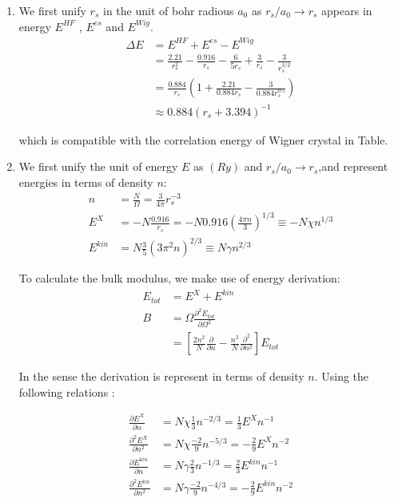 \documentclass[notitlepage]{revtex4-1}
\begin{document}
\begin{CJK}{UTF8}{bsmi}
\begin{enumerate}
 \item We first unify $r_s$ in the unit of bohr radious $a_0$ as $r_s/a_0 \rightarrow r_s$ appears in energy $E^{HF}$ , $E^{es}$ and $E^{Wig}$.
 \begin{align*}
 	\Delta E &= E^{HF} + E^{es} - E^{Wig} \\	
 			 &= \frac{2.21}{r_s^2} - \frac{0.916}{r_s} - \frac{6}{5r_s} + \frac{3}{r_s} - \frac{3}{r_s^{3/2}} \\
 			 &= \frac{0.884}{r_s}\left( 1 + \frac{2.21}{0.884r_s} - \frac{3}{0.884r_s^{0.5}}\right) \\
 			 &\approx 0.884(r_s+3.394)^{-1}
 \end{align*}
 
 which is compatible with the correlation energy of Wigner crystal in Table.
 	
 \item We first unify the unit of energy $E$ as $(Ry)$ and $r_s/a_0 \rightarrow r_s$,and represent energies in terms of density $n$:
 \begin{align*}
 		n    &= \frac{N}{\Omega} = \frac{3}{4\pi} r_s^{-3} \\
	 E^{X}   &= -N \frac{0.916}{r_s} = -N 0.916 \left( \frac{4\pi n}{3} \right)^{1/3} \equiv -N\chi n^{1/3}\\
	 E^{kin} &= N\frac{3}{5} (3\pi^2 n)^{2/3} \equiv N \gamma n^{2/3}
 \end{align*}
 
 To calculate the bulk modulus, we make use of energy derivation:
 \begin{align*}
 	E_{tot} &= E^{X} + E^{kin} \\
 	B &= \Omega \frac{\partial^2 E_{tot}}{\partial\Omega^2} \\
 	  &= \left[ \frac{2n^2}{N} \frac{\partial}{\partial n} - \frac{n^3}{N}\frac{\partial^2}{\partial n^2} \right]E_{tot}
 \end{align*}
 
 In the sense the derivation is represent in terms of density $n$. Using the following relations :
 
 \begin{align*}
 	\frac{\partial E^X}{\partial n } &= N \chi \frac{1}{3} n^{-2/3} = \frac{1}{3} E^X n^{-1}\\
 	\frac{\partial^2 E^X}{\partial n^2} &= N \chi \frac{-2}{9} n^{-5/3} = -\frac{2}{9} E^X n^{-2} \\
 	\frac{\partial E^{kin}}{\partial n } &= N \gamma \frac{2}{3} n^{-1/3} = \frac{2}{3} E^{kin} n^{-1}\\
	\frac{\partial^2 E^{lin}}{\partial n^2} &= N \gamma \frac{-2}{9} n^{-4/3} = -\frac{2}{9} E^{kin} n^{-2} \\ 		 
 \end{align*}
 

\end{enumerate}
\end{CJK}
\end{document}
